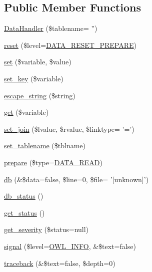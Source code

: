 \subsection*{Public Member Functions}
\begin{DoxyCompactItemize}
\item 
\hyperlink{classDataHandler_aed5b2eb4ca7b2e4b0c1563d817d73c16}{DataHandler} (\$tablename= '')
\item 
\hyperlink{classDataHandler_ab89e1aaad9cd0a37f1c7f13c1d9c0d57}{reset} (\$level=\hyperlink{class_8datahandler_8php_a19a99423705b41e563424ae76d7fe184}{DATA\_\-RESET\_\-PREPARE})
\item 
\hyperlink{classDataHandler_a296f26f5af1e46a49ae44110848fa031}{set} (\$variable, \$value)
\item 
\hyperlink{classDataHandler_a32ce223478b78a4ea9838a3c6ac7440c}{set\_\-key} (\$variable)
\item 
\hyperlink{classDataHandler_a435338a167a44a041af2895859abb0c9}{escape\_\-string} (\$string)
\item 
\hyperlink{classDataHandler_a7dcf85dac419f51ad4daa166c928a399}{get} (\$variable)
\item 
\hyperlink{classDataHandler_a9b77733f02e9d6281fc40df110c0ba70}{set\_\-join} (\$lvalue, \$rvalue, \$linktype= '=')
\item 
\hyperlink{classDataHandler_abcb68472abd7da8ee6296421f0a7f2e9}{set\_\-tablename} (\$tblname)
\item 
\hyperlink{classDataHandler_af3e7a17194e97300d499e9178f4913cb}{prepare} (\$type=\hyperlink{class_8datahandler_8php_ac28f74b49007773d24ca2207baac6d32}{DATA\_\-READ})
\item 
\hyperlink{classDataHandler_abb329fe5a97eb8df928aabfc8078ff23}{db} (\&\$data=false, \$line=0, \$file= '\mbox{[}unknown\mbox{]}')
\item 
\hyperlink{classDataHandler_a3c82ec0a40dabcc55dc203c96abf02d2}{db\_\-status} ()
\item 
\hyperlink{class__OWL_a99ec771fa2c5c279f80152cc09e489a8}{get\_\-status} ()
\item 
\hyperlink{class__OWL_adf9509ef96858be7bdd9414c5ef129aa}{get\_\-severity} (\$status=null)
\item 
\hyperlink{class__OWL_a51ba4a16409acf2a2f61f286939091a5}{signal} (\$level=\hyperlink{owl_8severitycodes_8php_a139328861128689f2f4def6a399d9057}{OWL\_\-INFO}, \&\$text=false)
\item 
\hyperlink{class__OWL_aa29547995d6741b7d2b90c1d4ea99a13}{traceback} (\&\$text=false, \$depth=0)
\end{DoxyCompactItemize}
